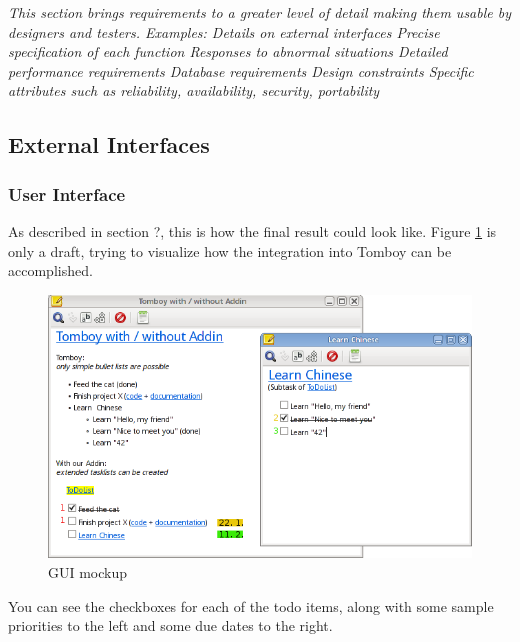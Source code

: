 \textit{This section brings requirements to a greater level of detail making them usable by designers and testers. Examples:
Details on external interfaces
Precise specification of each function
Responses to abnormal situations
Detailed performance requirements
Database requirements
Design constraints
Specific attributes such as reliability, availability, security, portability}

\subsection{External Interfaces}
\label{requirements:interfaces}

	\subsubsection{User Interface} %
	\label{requirements:interfaces:user}
        
        As described in section ?, this is how the final result could look like. Figure \ref{gui} is only a draft, trying to visualize how the integration into Tomboy can be accomplished.
        \begin{figure}[h]
          \includegraphics[width=\textwidth]{graphics/Screenshot_cropped_edited.png}
          \caption{GUI mockup}
          \label{gui}
        \end{figure}
        You can see the checkboxes for each of the todo items, along with some sample priorities to the left and some due dates to the right.
	
	
